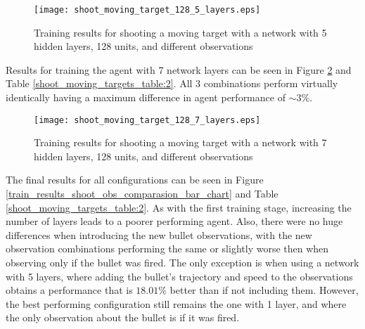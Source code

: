 \begin{figure}
    \begin{center}
        \texttt{[image: shoot\_moving\_target\_128\_5\_layers.eps]}
        \caption{Training results for shooting a moving target with a network with 5 hidden layers, 128 units, and different observations}
        \label{train_results_shoot_obs_comparasion_5_layers}
    \end{center}
\end{figure}

Results for training the agent with 7 network layers can be seen in Figure \ref{train_results_shoot_obs_comparasion_7_layers} and Table \ref{shoot_moving_targets_table:2}. All 3 combinations perform virtually identically having a maximum difference in agent performance of $\sim3\%$.

\begin{figure}
    \begin{center}
        \texttt{[image: shoot\_moving\_target\_128\_7\_layers.eps]}
        \caption{Training results for shooting a moving target with a network with 7 hidden layers, 128 units, and different observations}
        \label{train_results_shoot_obs_comparasion_7_layers}
    \end{center}
\end{figure}


The final results for all configurations can be seen in Figure \ref{train_results_shoot_obs_comparasion_bar_chart} and Table \ref{shoot_moving_targets_table:2}. As with the first training stage, increasing the number of layers leads to a poorer performing agent. Also, there were no huge differences when introducing the new bullet observations, with the new observation combinations performing the same or slightly worse then when observing only if the bullet was fired. The only exception is when using a network with 5 layers, where adding the bullet's trajectory and speed to the observations obtains a performance that is $18.01\%$ better than if not including them. However, the best performing configuration still remains the one with 1 layer, and where the only observation about the bullet is if it was fired.

